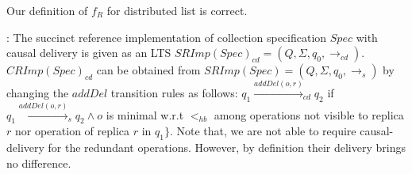 \begin{lemma}
\label{lemma:Minus for distributed list is correct}
Our definition of $f_R$ for distributed list is correct.
\end{lemma}


: The succinct reference implementation of collection specification $Spec$ with causal delivery is given as an LTS $SRImp(Spec)_{\mathit{cd}} = (Q,\Sigma,q_0,\rightarrow_{\mathit{cd}})$. $CRImp(Spec)_{\mathit{cd}}$ can be obtained from $SRImp(Spec) = (Q,\Sigma,q_0,\rightarrow_s)$ by changing the $addDel$  transition rules as follows: $q_1 {\xrightarrow{addDel(o,r)}}_{cd} q_2$ if $q_1 {\xrightarrow{addDel(o,r)}}_s q_2 \wedge o$ is minimal w.r.t $<_{hb}$ among operations not visible to replica $r$ nor operation of replica $r$ in $q_1 \}$. Note that, we are not able to require causal-delivery for the redundant operations. However, by definition their delivery brings no difference.
























